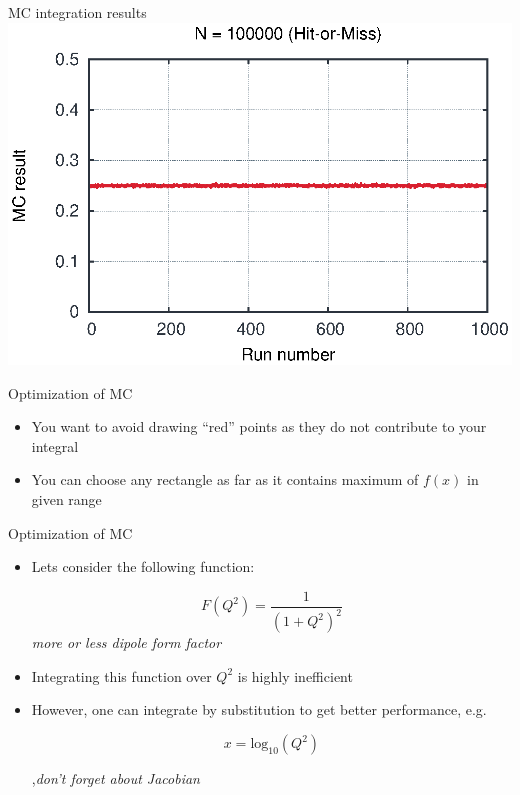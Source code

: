 \begin{emptyslide}{MC integration results}
{    \includegraphics[width=\columnwidth]{figures/int100000.eps}
  }

\vfill\null
\end{emptyslide}


\begin{slide}{Optimization of MC}
\null\vfill

  \twocolumn
  {
    \scalebox{.75}{}
  }
  {
    \scalebox{.75}{}
  }

  \begin{itemize}
   \item You want to avoid drawing ``red'' points as they do not contribute to your integral
   \item You can choose any rectangle as far as it contains maximum of $f(x)$ in given range
  \end{itemize}

\vfill\null
\end{slide}

\begin{slide}[toc=]{Optimization of MC}
\null\vfill

  \twocolumn
  {
    \begin{itemize}
      \item Lets consider the following function:
  
      $$F(Q^2) = \frac{1}{(1 + Q^2)^2}$$
      {\it\color{pdcolor3} more or less dipole form factor}
      
      \item Integrating this function over $Q^2$ is highly inefficient
      
      \item However, one can integrate by substitution to get better performance, e.g.
      
      $$x = \mbox{log}_{10}(Q^2)$$
      
    \sep{\it\color{pdcolor6}don't forget about Jacobian}

    \end{itemize}

  }
  {
    
    \vspace{-10pt}
        
  }
    
\vfill\null
\end{slide}

